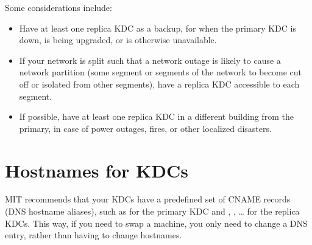 \documentclass[letterpaper,10pt,english]{sphinxmanual}
\begin{document}
Some considerations include:
\begin{itemize}
\item {} 
Have at least one replica KDC as a backup, for when the primary KDC
is down, is being upgraded, or is otherwise unavailable.

\item {} 
If your network is split such that a network outage is likely to
cause a network partition (some segment or segments of the network
to become cut off or isolated from other segments), have a replica
KDC accessible to each segment.

\item {} 
If possible, have at least one replica KDC in a different building
from the primary, in case of power outages, fires, or other
localized disasters.

\end{itemize}


\section{Hostnames for KDCs}
\label{\detokenize{admin/realm_config:kdc-hostnames}}\label{\detokenize{admin/realm_config:hostnames-for-kdcs}}
MIT recommends that your KDCs have a predefined set of CNAME records
(DNS hostname aliases), such as  for the primary KDC and
, , … for the replica KDCs.  This way,
if you need to swap a machine, you only need to change a DNS entry,
rather than having to change hostnames.
\end{document}
